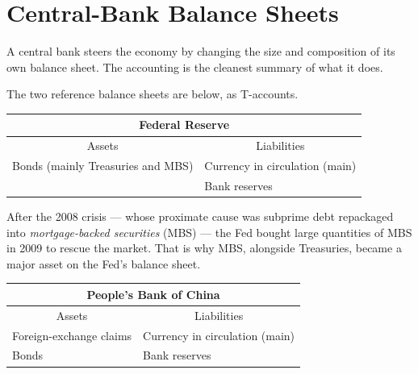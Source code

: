 \section{Central-Bank Balance Sheets}

A central bank steers the economy by changing the size and composition of its own balance sheet. The accounting is the cleanest summary of what it does.


The two reference balance sheets are below, as T-accounts.

\begin{table}[h]
\centering
\begin{tabular}{@{}p{} p{}@{}}
\multicolumn{2}{c}{\textbf{Federal Reserve}}\\
\toprule
\multicolumn{1}{c}{Assets} & \multicolumn{1}{c}{Liabilities}\\
\midrule
Bonds (mainly Treasuries and MBS) & Currency in circulation (main) \\
 & Bank reserves \\
\bottomrule
\end{tabular}
\end{table}

\begin{remark}
After the 2008 crisis --- whose proximate cause was subprime debt repackaged into \emph{mortgage-backed securities} (MBS) --- the Fed bought large quantities of MBS in 2009 to rescue the market. That is why MBS, alongside Treasuries, became a major asset on the Fed's balance sheet.
\end{remark}

\begin{table}[h]
\centering
\begin{tabular}{@{}p{} p{}@{}}
\multicolumn{2}{c}{\textbf{People's Bank of China}}\\
\toprule
\multicolumn{1}{c}{Assets} & \multicolumn{1}{c}{Liabilities}\\
\midrule
Foreign-exchange claims & Currency in circulation (main) \\
Bonds & Bank reserves \\
\bottomrule
\end{tabular}
\end{table}

